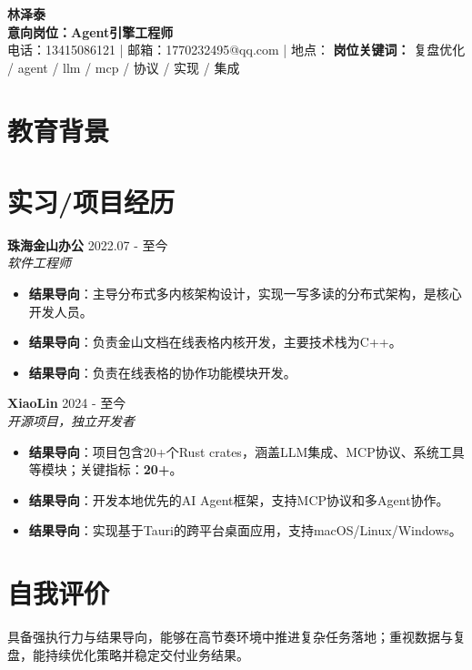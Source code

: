 \documentclass[a4paper,10pt]{article}
\begin{document}
\begin{center}
{\Huge \textbf{林泽泰}} \\
\vspace{0.15cm}
\textbf{意向岗位：Agent引擎工程师} \\
\vspace{0.1cm}
电话：13415086121 \quad | \quad 邮箱：1770232495@qq.com \quad | \quad 地点：
\vspace{0.08cm}
\textbf{岗位关键词：} 复盘优化 / agent / llm / mcp / 协议 / 实现 / 集成
\end{center}
\section*{教育背景}
\section*{实习/项目经历}
\textbf{珠海金山办公} \hfill 2022.07 - 至今 \\
\textit{软件工程师} \hfill 
\begin{itemize}[leftmargin=*, itemsep=2pt, parsep=0pt, topsep=2pt]
    \item \textbf{结果导向}：主导分布式多内核架构设计，实现一写多读的分布式架构，是核心开发人员。
    \item \textbf{结果导向}：负责金山文档在线表格内核开发，主要技术栈为C++。
    \item \textbf{结果导向}：负责在线表格的协作功能模块开发。
\end{itemize}
\textbf{XiaoLin} \hfill 2024 - 至今 \\
\textit{开源项目，独立开发者} \hfill 
\begin{itemize}[leftmargin=*, itemsep=2pt, parsep=0pt, topsep=2pt]
    \item \textbf{结果导向}：项目包含20+个Rust crates，涵盖LLM集成、MCP协议、系统工具等模块；关键指标：\textbf{20+}。
    \item \textbf{结果导向}：开发本地优先的AI Agent框架，支持MCP协议和多Agent协作。
    \item \textbf{结果导向}：实现基于Tauri的跨平台桌面应用，支持macOS/Linux/Windows。
\end{itemize}
\section*{自我评价}
具备强执行力与结果导向，能够在高节奏环境中推进复杂任务落地；重视数据与复盘，能持续优化策略并稳定交付业务结果。
\end{document}
